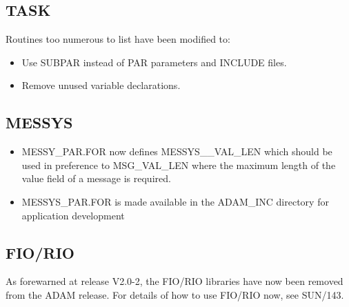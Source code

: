 \subsection{TASK}
Routines too numerous to list have been modified to:
\begin{itemize}
\item Use SUBPAR instead of PAR parameters and INCLUDE files.
\item Remove unused variable declarations.
\end{itemize}

\subsection{MESSYS}
\begin{itemize}
\item MESSY\_PAR.FOR now defines MESSYS\_\_VAL\_LEN which should be used in
preference to MSG\_VAL\_LEN where the maximum length of the value field of a
message is required.
\item MESSYS\_PAR.FOR is made available in the ADAM\_INC directory for
application development
\end{itemize}

\subsection{FIO/RIO}
As forewarned at release V2.0-2, the FIO/RIO libraries have now been removed 
from the ADAM release.
For details of how to use FIO/RIO now, see SUN/143.

